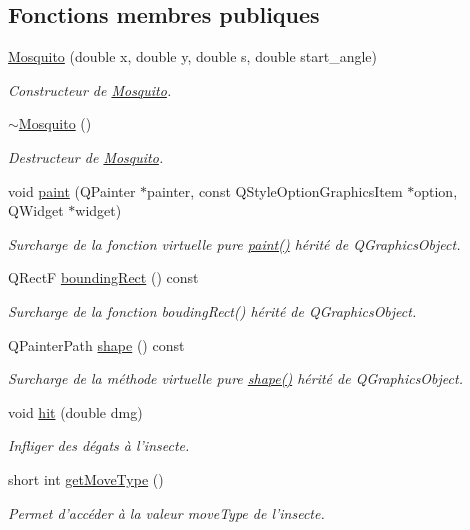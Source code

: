 \subsection*{Fonctions membres publiques}
\begin{DoxyCompactItemize}
\item 
\hyperlink{classMosquito_ad7755ed5b7cd5ed184c5cfb2d4f0785d}{Mosquito} (double x, double y, double s, double start\_\-angle)
\begin{DoxyCompactList}\small\item\em Constructeur de \hyperlink{classMosquito}{Mosquito}. \end{DoxyCompactList}\item 
\hyperlink{classMosquito_aec4169f2175c544c8d6e119164b469cd}{$\sim$Mosquito} ()
\begin{DoxyCompactList}\small\item\em Destructeur de \hyperlink{classMosquito}{Mosquito}. \end{DoxyCompactList}\item 
void \hyperlink{classMosquito_a306ab9aefce1f42ae5d46746a018c845}{paint} (QPainter $\ast$painter, const QStyleOptionGraphicsItem $\ast$option, QWidget $\ast$widget)
\begin{DoxyCompactList}\small\item\em Surcharge de la fonction virtuelle pure \hyperlink{classMosquito_a306ab9aefce1f42ae5d46746a018c845}{paint()} hérité de QGraphicsObject. \end{DoxyCompactList}\item 
QRectF \hyperlink{classBug_a9b39c25361faad07b1bf2dd927d09dab}{boundingRect} () const 
\begin{DoxyCompactList}\small\item\em Surcharge de la fonction boudingRect() hérité de QGraphicsObject. \end{DoxyCompactList}\item 
QPainterPath \hyperlink{classBug_a587a36d3145c2b4dba6c689af22c65ac}{shape} () const 
\begin{DoxyCompactList}\small\item\em Surcharge de la méthode virtuelle pure \hyperlink{classBug_a587a36d3145c2b4dba6c689af22c65ac}{shape()} hérité de QGraphicsObject. \end{DoxyCompactList}\item 
void \hyperlink{classBug_a63402c05b5ba3fb034e41f1ced0e4b9f}{hit} (double dmg)
\begin{DoxyCompactList}\small\item\em Infliger des dégats à l'insecte. \end{DoxyCompactList}\item 
short int \hyperlink{classBug_aced471cedcfa855baddf4c827003e755}{getMoveType} ()
\begin{DoxyCompactList}\small\item\em Permet d'accéder à la valeur moveType de l'insecte. \end{DoxyCompactList}\end{DoxyCompactItemize}
